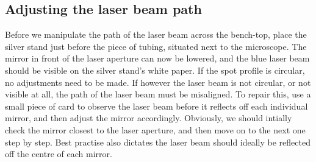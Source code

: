 \documentclass[14pt,a4paper] {article}
\begin{document}
\subsection{Adjusting the laser beam path}

Before we manipulate the path of the laser beam across the bench-top, place the silver stand just before the piece of tubing, situated next to the microscope. The mirror in front of the laser aperture can now be lowered, and the blue laser beam should be visible on the silver stand's white paper. If the spot profile is circular, no adjustments need to be made. If however the laser beam is not circular, or not visible at all, the path of the laser beam must be misaligned. To repair this, use a small piece of card to observe the laser beam before it reflects off each individual mirror, and then adjust the mirror accordingly. Obviously, we should intially check the mirror closest to the laser aperture, and then move on to the next one step by step. Best practise also dictates the laser beam should ideally be reflected off the centre of each mirror.











\end{document}

